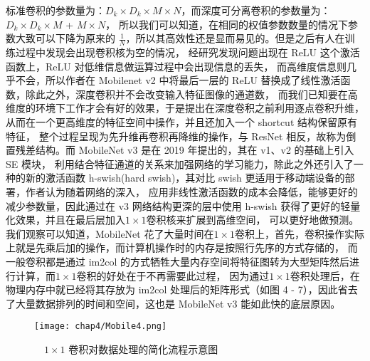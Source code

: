 标准卷积的参数量为：$D_k \times D_k \times M \times N$，而深度可分离卷积的参数量为：$D_k\times D_k \times M$ + $M \times N$，
所以我们可以知道，在相同的权值参数数量的情况下参数大致可以下降为原来的 $\frac{1}{N}$，所以其高效性还是显而易见的。但是之后有人在训练过程中发现会出现卷积核为空的情况，
经研究发现问题出现在 ReLU 这个激活函数上，ReLU 对低维信息做运算过程中会出现信息的丢失，
而高维度信息则几乎不会，所以作者在 Mobilenet v2 中将最后一层的 ReLU 替换成了线性激活函数，除此之外，深度卷积并不会改变输入特征图像的通道数，
而我们已知要在高维度的环境下工作才会有好的效果，于是提出在深度卷积之前利用逐点卷积升维，从而在一个更高维度的特征空间中操作，并且还加入一个 shortcut 结构保留原有特征，
整个过程呈现为先升维再卷积再降维的操作，与 ResNet 相反，故称为倒置残差结构。而 MobileNet v3 是在 2019 年提出的，其在 v1、v2 的基础上引入 SE 模块，
利用结合特征通道的关系来加强网络的学习能力，除此之外还引入了一种的新的激活函数 h-swish(hard swish)，其对比 swish 更适用于移动端设备的部署，作者认为随着网络的深入，
应用非线性激活函数的成本会降低，能够更好的减少参数量，因此通过在 v3 网络结构更深的层中使用 h-swish 获得了更好的轻量化效果，并且在最后层加入$1\times 1$卷积核来扩展到高维空间，
可以更好地做预测。我们观察可以知道，MobileNet 花了大量时间在$1\times 1$卷积上，首先，卷积操作实际上就是先乘后加的操作，而计算机操作时的内存是按照行先序的方式存储的，
而一般卷积都是通过 im2col 的方式牺牲大量内存空间将特征图转为大型矩阵然后进行计算，而$1\times 1$卷积的好处在于不再需要此过程，
因为通过$1\times 1$卷积处理后，在物理内存中就已经将其存放为 im2col 处理后的矩阵形式（如图 4 - 7），因此省去了大量数据排列的时间和空间，这也是 MobileNet v3 能如此快的底层原因。
\vspace{3mm}
\begin{figure}[htbp]
	\centering
	\texttt{[image: chap4/Mobile4.png]}
	\caption{\ \ $1\times 1$ 卷积对数据处理的简化流程示意图}
	\label{fig4-7}
\end{figure}
\vspace{3mm}


